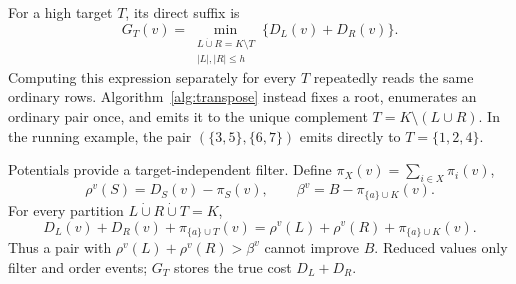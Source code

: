\documentclass[sigconf,nonacm]{acmart}
\begin{document}
For a high target $T$, its direct suffix is
\begin{equation}
 G_T(v)=\min_{\substack{L\mathbin{\dot\cup}R=K\setminus T\\|L|,|R|\leq h}}
 \{D_L(v)+D_R(v)\}.
 \label{eq:terminal}
\end{equation}
Computing this expression separately for every $T$ repeatedly reads the same ordinary rows.  Algorithm~\ref{alg:transpose} instead fixes a root, enumerates an ordinary pair once, and emits it to the unique complement $T=K\setminus(L\cup R)$.  In the running example, the pair $(\{3,5\},\{6,7\})$ emits directly to $T=\{1,2,4\}$.

Potentials provide a target-independent filter.  Define $\pi_X(v)=\sum_{i\in X}\pi_i(v)$,
\[
 \rho^v(S)=D_S(v)-\pi_S(v),\qquad
 \beta^v=B-\pi_{\{a\}\cup K}(v).
\]
For every partition $L\mathbin{\dot\cup}R\mathbin{\dot\cup}T=K$,
\begin{equation}
 D_L(v)+D_R(v)+\pi_{\{a\}\cup T}(v)
 =\rho^v(L)+\rho^v(R)+\pi_{\{a\}\cup K}(v).
 \label{eq:reduced}
\end{equation}
Thus a pair with $\rho^v(L)+\rho^v(R)>\beta^v$ cannot improve $B$.  Reduced values only filter and order events; $G_T$ stores the true cost $D_L+D_R$.

\makeatletter
\begingroup
\@twocolumnfalse
\begin{algorithm}[H]
\small
{}
\;
\caption{Root-wise transposed high-terminal generation.}
\label{alg:transpose}
\end{algorithm}
\endgroup
\makeatother
\end{document}
